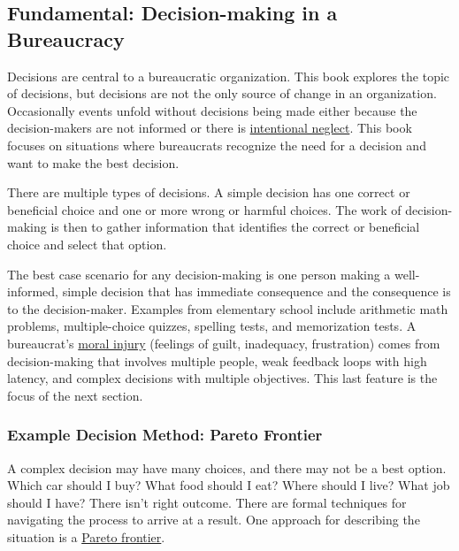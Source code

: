 \subsection*{Fundamental: Decision-making in a Bureaucracy\label{sec:decision-making}}

Decisions are central to a bureaucratic organization. This book explores the topic of decisions, but decisions are not the only source of change in an organization. Occasionally events unfold without decisions being made either because the decision-makers are not informed or there is  \href{https://en.wikipedia.org/wiki/Willful_blindness}{intentional neglect}. 
\iftoggle{WPinmargin}{\marginpar{$>$Wikipedia: Willful blindness}}{}
This book focuses on situations where bureaucrats recognize the need for a decision and want to make the best decision.

There are multiple types of decisions. 
A \gls{simple decision} \iftoggle{glossaryinmargin}{\marginpar{[Glossary]}}{}%
has one correct or beneficial choice and one or more wrong or harmful choices. The work of decision-making is then to gather information that identifies the correct or beneficial choice and select that option.

The best case scenario for any decision-making is one person making a well-informed, simple decision that has immediate consequence and the consequence is to the decision-maker. Examples from elementary school include arithmetic math problems, multiple-choice quizzes, spelling tests, and memorization tests. A bureaucrat's \href{https://en.wikipedia.org/wiki/Moral_injury}{moral injury}
\iftoggle{WPinmargin}{\marginpar{$>$Wikipedia: moral injury}}{}
(feelings of guilt, inadequacy, frustration)
comes from decision-making that involves multiple people, weak feedback loops with high latency, and complex decisions with multiple objectives. This last feature is the focus of the next section.

\subsubsection*{Example Decision Method: Pareto Frontier\label{sec:pareto}}

A complex decision may have many choices, and there may not be a best option. Which car should I buy? What food should I eat? Where should I live? What job should I have? There isn't  right outcome. There are formal techniques for navigating the process to arrive at a result. One approach for describing the situation is a \href{https://en.wikipedia.org/wiki/Pareto_front}{Pareto frontier}. 


